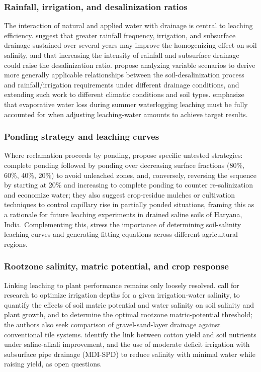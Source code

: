\subsubsection{Rainfall, irrigation, and desalinization ratios}

The interaction of natural and applied water with drainage is central to leaching efficiency. \textcite{Yu2015} suggest that greater rainfall frequency, irrigation, and subsurface drainage sustained over several years may improve the homogenizing effect on soil salinity, and that increasing the intensity of rainfall and subsurface drainage could raise the desalinization ratio. \textcite{Chen2025} propose analyzing variable scenarios to derive more generally applicable relationships between the soil-desalinization process and rainfall/irrigation requirements under different drainage conditions, and extending such work to different climatic conditions and soil types. \textcite{Wang2024d} emphasize that evaporative water loss during summer waterlogging leaching must be fully accounted for when adjusting leaching-water amounts to achieve target results.

\subsubsection{Ponding strategy and leaching curves}

Where reclamation proceeds by ponding, \textcite{RAO1991} propose specific untested strategies: complete ponding followed by ponding over decreasing surface fractions (80\%, 60\%, 40\%, 20\%) to avoid unleached zones, and, conversely, reversing the sequence by starting at 20\% and increasing to complete ponding to counter re-salinization and economize water; they also suggest crop-residue mulches or cultivation techniques to control capillary rise in partially ponded situations, framing this as a rationale for future leaching experiments in drained saline soils of Haryana, India. Complementing this, \textcite{Yang2022c} stress the importance of determining soil-salinity leaching curves and generating fitting equations across different agricultural regions.

\subsubsection{Rootzone salinity, matric potential, and crop response}

Linking leaching to plant performance remains only loosely resolved. \textcite{Zhang2021} call for research to optimize irrigation depths for a given irrigation-water salinity, to quantify the effects of soil matric potential and water salinity on soil salinity and plant growth, and to determine the optimal rootzone matric-potential threshold; the authors also seek comparison of gravel-sand-layer drainage against conventional tile systems. \textcite{Heng2021} identify the link between cotton yield and soil nutrients under saline-alkali improvement, and the use of moderate deficit irrigation with subsurface pipe drainage (MDI-SPD) to reduce salinity with minimal water while raising yield, as open questions.

